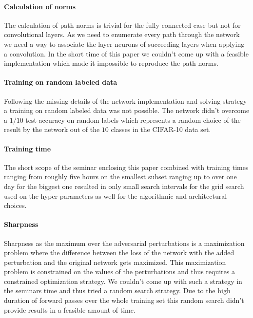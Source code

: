\paragraph{Calculation of norms}
\label{sec:problems-calculation-norms}
The calculation of path norms is trivial for the fully connected case but not for convolutional layers. As we need to enumerate every path through the network we need a way to associate the layer neurons of succeeding layers when applying a convolution. In the short time of this paper we couldn't come up with a feasible implementation which made it impossible to reproduce the path norms.
%
\paragraph{Training on random labeled data}
Following the missing details of the network implementation and solving strategy a training on random labeled data was not possible. The network didn't overcome a $1/10$ test accuracy on random labels which represents a random choice of the result by the network out of the $10$ classes in the CIFAR-10 data set.

\paragraph{Training time}
\label{sec:problems-training-time}
The short scope of the seminar enclosing this paper combined with training times ranging from roughly five hours on the smallest subset ranging up to over one day for the biggest one resulted in only small search intervals for the grid search used on the hyper parameters as well for the algorithmic and architectural choices.
%
\paragraph{Sharpness}
\label{sec:problems-sharpness}
Sharpness as the maximum over the adversarial perturbations is a maximization problem where the difference between the loss of the network with the added perturbation and the original network gets maximized. This maximization problem is constrained on the values of the perturbations and thus requires a constrained optimization strategy. We couldn't come up with such a strategy in the seminars time and thus tried a random search strategy. Due to the high duration of forward passes over the whole training set this random search didn't provide results in a feasible amount of time.
%
%
%
%
%
